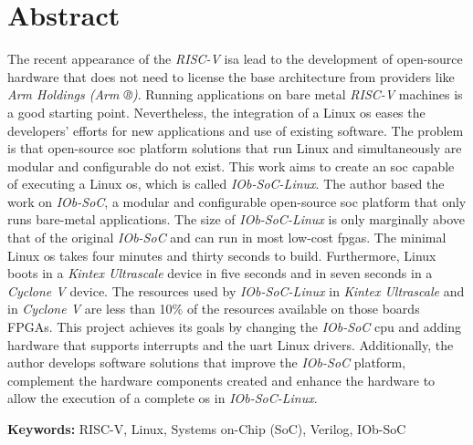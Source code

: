 \cleardoubleoddpage

\chapter*{Abstract}
\thispagestyle{empty} %
The recent appearance of the \textit{RISC-V} \acrshort{isa} lead to the development of open-source hardware that does not need to license the base architecture from providers like \textit{Arm Holdings (Arm ®)}. Running applications on bare metal \textit{RISC-V} machines is a good starting point. Nevertheless, the integration of a Linux \acrshort{os} eases the developers' efforts for new applications and use of existing software. The problem is that open-source \acrshort{soc} platform solutions that run Linux and simultaneously are modular and configurable do not exist. 
This work aims to create an \acrshort{soc} capable of executing a Linux \acrshort{os}, which is called \textit{IOb-SoC-Linux}. The author based the work on \textit{IOb-SoC}, a modular and configurable open-source \acrshort{soc} platform that only runs bare-metal applications. The size of \textit{IOb-SoC-Linux} is only marginally above that of the original \textit{IOb-SoC} and can run in most low-cost \acrshort{fpga}s. The minimal Linux \acrshort{os} takes four minutes and thirty seconds to build. Furthermore, Linux boots in a \textit{Kintex Ultrascale} device in five seconds and in seven seconds in a \textit{Cyclone V} device. The resources used by \textit{IOb-SoC-Linux} in \textit{Kintex Ultrascale} and in \textit{Cyclone V} are less than 10\% of the resources available on those boards FPGAs.
This project achieves its goals by changing the \textit{IOb-SoC} \acrshort{cpu} and adding hardware that supports interrupts and the \acrshort{uart} Linux drivers. Additionally, the author develops software solutions that improve the \textit{IOb-SoC} platform, complement the hardware components created and enhance the hardware to allow the execution of a complete \acrshort{os} in \textit{IOb-SoC-Linux}. 

\vfill

\textbf{\Large Keywords:} RISC-V, Linux, Systems on-Chip (SoC), Verilog, IOb-SoC